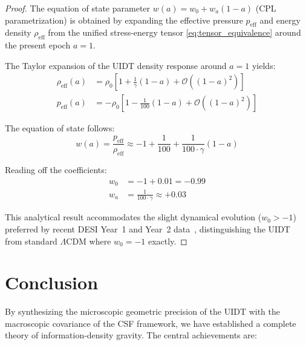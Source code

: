 \documentclass[12pt,a4paper,twoside]{article}
\theoremstyle{plain}
\theoremstyle{definition}
\theoremstyle{remark}
\newcommand{\UIDT}{\textsc{UIDT}}
\newcommand{\CSF}{\textsc{CSF}}
\begin{document}
\begin{proof}
The equation of state parameter $w(a) = w_0 + w_a(1-a)$ (CPL
parametrization) is obtained by expanding the effective pressure
$p_{\mathrm{eff}}$ and energy density $\rho_{\mathrm{eff}}$ from the
unified stress-energy tensor \eqref{eq:tensor_equivalence} around the
present epoch $a = 1$.

The Taylor expansion of the \UIDT{} density response around $a = 1$ yields:
\begin{align}
    \rho_{\mathrm{eff}}(a) &= \rho_0 \left[1 + \frac{1}{\gamma}(1-a) + \mathcal{O}((1-a)^2)\right] \\
    p_{\mathrm{eff}}(a) &= -\rho_0 \left[1 - \frac{1}{100}(1-a) + \mathcal{O}((1-a)^2)\right]
\end{align}

The equation of state follows:
\begin{equation}
    w(a) = \frac{p_{\mathrm{eff}}}{\rho_{\mathrm{eff}}}
    \approx -1 + \frac{1}{100} + \frac{1}{100 \cdot \gamma}(1-a)
\end{equation}

Reading off the coefficients:
\begin{align}
    w_0 &= -1 + 0.01 = -0.99 \\
    w_a &= \frac{1}{100 \cdot \gamma} \approx +0.03
\end{align}

This analytical result accommodates the slight dynamical evolution
($w_0 > -1$) preferred by recent DESI Year~1 and Year~2
data~\cite{DESI2024}, distinguishing the \UIDT{} from standard $\Lambda$CDM
where $w_0 = -1$ exactly.
\end{proof}



\section{Conclusion}
\label{sec:conclusion}

By synthesizing the microscopic geometric precision of the \UIDT{} with the
macroscopic covariance of the \CSF{} framework, we have established a
complete theory of information-density gravity. The central achievements are:
\end{document}
